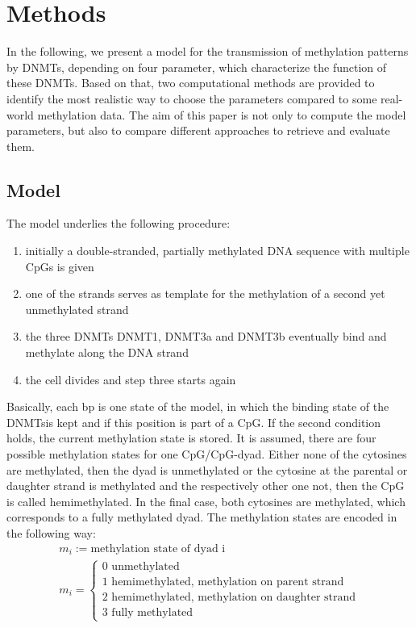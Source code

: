 \chapter{Methods}
\label{chapter:methods}
In the following, we present a model for the transmission of methylation patterns by \acp{DNMT}, depending on four parameter, which characterize the function of these \acp{DNMT}. Based on that, two computational methods are provided to identify the most realistic way to choose the parameters compared to some real-world methylation data. The aim of this paper is not only to compute the model parameters, but also to compare different approaches to retrieve and evaluate them.

\section{Model}
\label{Model}
The model underlies the following procedure:
\begin{enumerate}
\item initially a double-stranded, partially methylated DNA sequence with multiple \acp{CpG} is given
\item one of the strands serves as template for the methylation of a second yet unmethylated strand
\item the three \acp{DNMT} DNMT1, DNMT3a and DNMT3b eventually bind and methylate along the DNA strand
\item the cell divides and step three starts again
\end{enumerate}
Basically, each \ac{bp} is one state of the model, in which the binding state of the \acp{DNMT}is kept and if this position is part of a \ac{CpG}. If the second condition holds, the current methylation state is stored. It is assumed, there are four possible methylation states for one \ac{CpG}/\ac{CpG}-dyad. Either none of the cytosines are methylated, then the dyad is unmethylated or the cytosine at the parental or daughter strand is methylated and the respectively other one not, then the \ac{CpG} is called hemimethylated. In the final case, both cytosines are methylated, which corresponds to a fully methylated dyad. The methylation states are encoded in the following way:\newline
\begin{align}
m_i := \text{methylation state of dyad i}\\
m_i = \left\{
\begin{array}{l}
\text{0 unmethylated} \\
\text{1 hemimethylated, methylation on parent strand} \\
\text{2 hemimethylated, methylation on daughter strand} \\
\text{3 fully methylated}
\end{array}
\right.
\end{align}

